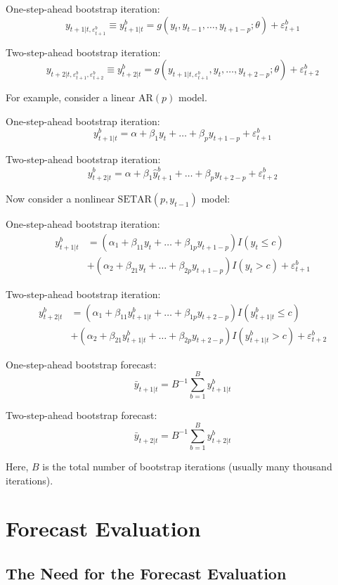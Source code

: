 \documentclass[
  12pt,
  oneside]{book}
\begin{document}
One-step-ahead bootstrap iteration: \[y_{t+1|t,\varepsilon_{t+1}^b} \equiv y_{t+1|t}^b = g(y_{t},y_{t-1},\ldots,y_{t+1-p};\theta)+\varepsilon_{t+1}^b\]

Two-step-ahead bootstrap iteration: \[y_{t+2|t,\varepsilon_{t+1}^b,\varepsilon_{t+2}^b} \equiv y_{t+2|t}^b = g(y_{t+1|t,\varepsilon_{t+1}^b},y_{t},\ldots,y_{t+2-p};\theta)+\varepsilon_{t+2}^b\]

For example, consider a linear \(\text{AR}(p)\) model.

One-step-ahead bootstrap iteration: \[y_{t+1|t}^b = \alpha + \beta_1 y_{t} + \ldots + \beta_p y_{t+1-p}+\varepsilon_{t+1}^b\]

Two-step-ahead bootstrap iteration: \[y_{t+2|t}^b = \alpha + \beta_1 \hat{y}_{t+1}^b + \ldots + \beta_p y_{t+2-p}+\varepsilon_{t+2}^b\]

Now consider a nonlinear \(\text{SETAR}(p,y_{t-1})\) model:

One-step-ahead bootstrap iteration:
\[\begin{aligned}
y_{t+1|t}^b &= (\alpha_1 + \beta_{11} y_{t} + \ldots + \beta_{1p} y_{t+1-p})I(y_{t} \leq c) \\ 
                &+ (\alpha_2 + \beta_{21} y_{t} + \ldots + \beta_{2p} y_{t+1-p})I(y_{t} > c)+\varepsilon_{t+1}^b
\end{aligned}\]

Two-step-ahead bootstrap iteration:
\[\begin{aligned}
y_{t+2|t}^b &= (\alpha_1 + \beta_{11} y_{t+1|t}^b + \ldots + \beta_{1p} y_{t+2-p})I(y_{t+1|t}^b \leq c) \\
                &+ (\alpha_2 + \beta_{21} y_{t+1|t}^b + \ldots + \beta_{2p} y_{t+2-p})I(y_{t+1|t}^b > c)+\varepsilon_{t+2}^b
\end{aligned}\]

One-step-ahead bootstrap forecast: \[\bar{y}_{t+1|t} = B^{-1}\sum_{b=1}^{B}y_{t+1|t}^b\]

Two-step-ahead bootstrap forecast: \[\bar{y}_{t+2|t} = B^{-1}\sum_{b=1}^{B}y_{t+2|t}^b\]

Here, \(B\) is the total number of bootstrap iterations (usually many thousand iterations).

\hypertarget{forecast-evaluation}{%
\chapter{Forecast Evaluation}\label{forecast-evaluation}}

\hypertarget{the-need-for-the-forecast-evaluation}{%
\section{The Need for the Forecast Evaluation}\label{the-need-for-the-forecast-evaluation}}
\end{document}
